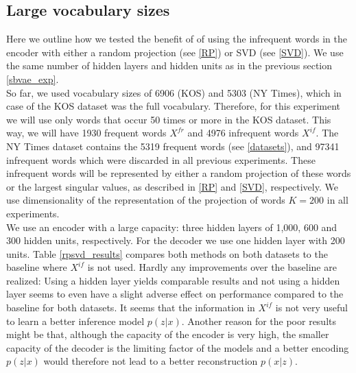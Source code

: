 \documentclass{report}
\begin{document}
	
	\subsection{Large vocabulary sizes}\label{large_voc_size}
	
	
	Here we outline how we tested the benefit of of using the infrequent words in the encoder with either a random projection (see \ref{RP}) or SVD (see \ref{SVD}). We use the same number of hidden layers and hidden units as in the previous section \ref{sbvae_exp}. \\
	So far, we used vocabulary sizes of 6906 (KOS) and 5303 (NY Times), which in case of the KOS dataset was the full vocabulary. Therefore, for this experiment we will use only words that occur 50 times or more in the KOS dataset. This way, we will have 1930 frequent words $X^{fr}$ and 4976 infrequent words $X^{if}$. The NY Times dataset contains the 5319 frequent words (see \ref{datasets}), and 97341 infrequent words which were discarded in all previous experiments. These infrequent words will be represented by either a random projection of these words or the largest singular values, as described in \ref{RP} and \ref{SVD}, respectively. We use dimensionality of the representation of the projection of words $K = 200$ in all experiments. \\
	We use an encoder with a large capacity: three hidden layers of 1,000, 600 and 300 hidden units, respectively. For the decoder we use one hidden layer with 200 units.
	Table \ref{rpsvd_results} compares both methods on both datasets to the baseline where $X^{if}$ is not used. Hardly any improvements over the baseline are realized: Using a hidden layer yields comparable results and not using a hidden layer seems to even have a slight adverse effect on performance compared to the baseline for both datasets. It seems that the information in $X^{if}$ is not very useful to learn a better inference model $p(z|x)$. Another  reason for the poor results might be that, although the capacity of the encoder is very high, the smaller capacity of the decoder is the limiting factor of the models and a better encoding $p(z|x)$ would therefore not lead to a better reconstruction $p(x|z)$.
	
\end{document}
